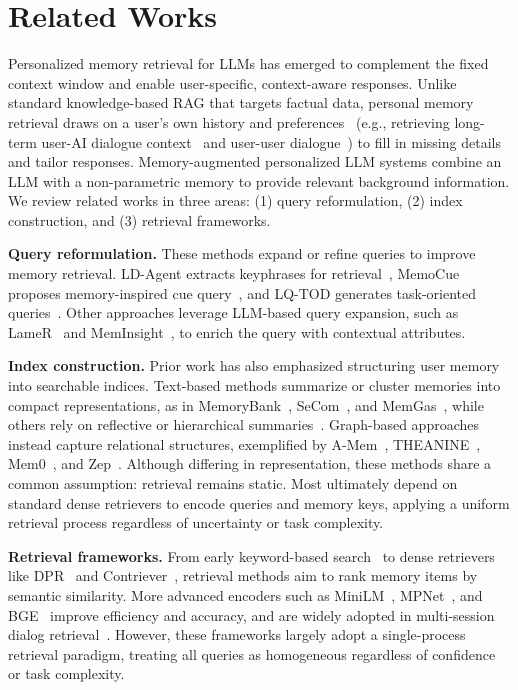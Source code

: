 \section{Related Works}

Personalized memory retrieval for LLMs has emerged to complement the fixed context window and enable user-specific, context-aware responses. Unlike standard knowledge-based RAG that targets factual data, personal memory retrieval draws on a user’s own history and preferences~\citep{pan2025secom,wu2024longmemeval,xu2025towards} ({e.g.}, retrieving long-term user-AI dialogue context~\citep{jiang2025know,maharana2024evaluating,wu2024longmemeval} and user-user dialogue~\citep{tan2025personabench}) to fill in missing details and tailor responses. Memory-augmented personalized LLM systems combine an LLM with a non-parametric memory to provide relevant background information. We review related works in three areas: (1) query reformulation, (2) index construction, and (3) retrieval frameworks. 

\textbf{Query reformulation.} These methods expand or refine queries to improve memory retrieval. LD-Agent extracts keyphrases for retrieval~\citep{li2025hello}, MemoCue proposes memory-inspired cue query~\citep{zhao2025memocue}, and LQ-TOD generates task-oriented queries~\citep{chen2025llm}. Other approaches leverage LLM-based query expansion, such as LameR~\citep{shen2024retrieval} and MemInsight~\citep{salama2025meminsight}, to enrich the query with contextual attributes.  

\textbf{Index construction.} Prior work has also emphasized structuring user memory into searchable indices. Text-based methods summarize or cluster memories into compact representations, as in MemoryBank~\citep{zhong2024memorybank}, SeCom~\citep{pan2025secom}, and MemGas~\citep{xu2025towards}, while others rely on reflective or hierarchical summaries~\citep{tan2025prospect}. Graph-based approaches instead capture relational structures, exemplified by A-Mem~\citep{xu2025mem}, THEANINE~\citep{ong2024towards}, Mem0~\citep{chhikara2025mem0}, and Zep~\citep{rasmussen2025zep}. Although differing in representation, these methods share a common assumption: retrieval remains static. Most ultimately depend on standard dense retrievers to encode queries and memory keys, applying a uniform retrieval process regardless of uncertainty or task complexity.

\textbf{Retrieval frameworks.} From early keyword-based search~\citep{robertson2009probabilistic} to dense retrievers like DPR~\citep{karpukhin2020dense} and Contriever~\citep{lei2023unsupervised}, retrieval methods aim to rank memory items by semantic similarity. More advanced encoders such as MiniLM~\citep{wang2020minilm}, MPNet~\citep{song2020mpnet}, and BGE~\citep{luo2024bge} improve efficiency and accuracy, and are widely adopted in multi-session dialog retrieval~\citep{xu2021beyond}. However, these frameworks largely adopt a single-process retrieval paradigm, treating all queries as homogeneous regardless of confidence or task complexity.  

